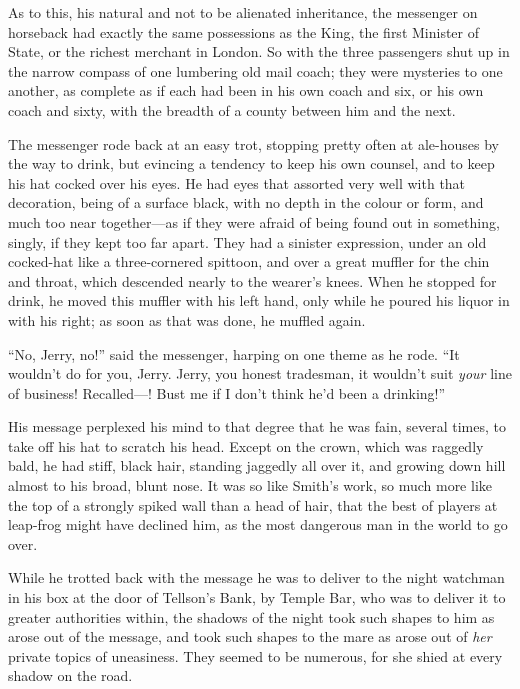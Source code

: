 As to this, his natural and not to be alienated inheritance,
the messenger on horseback had exactly the same possessions as
the King, the first Minister of State, or the richest merchant
in London.  So with the three passengers shut up in the narrow
compass of one lumbering old mail coach; they were mysteries to
one another, as complete as if each had been in his own coach and
six, or his own coach and sixty, with the breadth of a county
between him and the next.

The messenger rode back at an easy trot, stopping pretty often at
ale-houses by the way to drink, but evincing a tendency to keep his
own counsel, and to keep his hat cocked over his eyes.  He had eyes
that assorted very well with that decoration, being of a surface
black, with no depth in the colour or form, and much too near
together---as if they were afraid of being found out in something,
singly, if they kept too far apart.  They had a sinister expression,
under an old cocked-hat like a three-cornered spittoon, and over a
great muffler for the chin and throat, which descended nearly to the
wearer's knees.  When he stopped for drink, he moved this muffler
with his left hand, only while he poured his liquor in with his
right; as soon as that was done, he muffled again.

``No, Jerry, no!'' said the messenger, harping on one theme as he rode.
``It wouldn't do for you, Jerry.  Jerry, you honest tradesman, it
wouldn't suit \emph{your} line of business!  Recalled---!  Bust me if I
don't think he'd been a drinking!''

His message perplexed his mind to that degree that he was fain,
several times, to take off his hat to scratch his head.  Except on
the crown, which was raggedly bald, he had stiff, black hair,
standing jaggedly all over it, and growing down hill almost to his
broad, blunt nose.  It was so like Smith's work, so much more like
the top of a strongly spiked wall than a head of hair, that the best
of players at leap-frog might have declined him, as the most
dangerous man in the world to go over.

While he trotted back with the message he was to deliver to the night
watchman in his box at the door of Tellson's Bank, by Temple Bar, who
was to deliver it to greater authorities within, the shadows of the
night took such shapes to him as arose out of the message, and took
such shapes to the mare as arose out of \emph{her} private topics of
uneasiness.  They seemed to be numerous, for she shied at every
shadow on the road.

